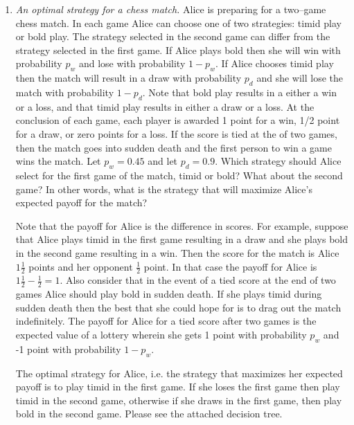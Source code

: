 \begin{enumerate}
\item \emph{An optimal strategy for a chess match.}  Alice is
  preparing for a two--game chess match.  In each game Alice can
  choose one of two strategies: timid play or bold play. The strategy
  selected in the second game can differ from the strategy selected
  in the first game. If Alice plays bold then she will win with
  probability $p_w$ and lose with probability $1-p_w$. If Alice
  chooses timid play then the match will result in a draw with probability
  $p_d$ and she will lose the match with probability $1-p_d$. Note
  that bold play results in a either a win or a loss, and that timid
  play results in either a draw or a loss. At the conclusion of each
  game, each player is awarded 1 point for a win, 1/2 point for a
  draw, or zero points for a loss. If the score is tied at the of two
  games, then the match goes into sudden death and the first person to
  win a game wins the match.  Let $p_w=0.45$ and let $p_d=0.9$. Which
  strategy should Alice select for the first game of the match, timid
  or bold? What about the second game? In other words, what is the
  strategy that will maximize Alice's expected payoff for the match?

  Note that the payoff for Alice is the difference in scores. For
  example, suppose that Alice plays timid in the first game resulting
  in a draw and she plays bold in the second game resulting in a win.
  Then the score for the match is Alice $1\frac{1}{2}$ points and her
  opponent $\frac{1}{2}$ point. In that case the payoff for Alice is
  $1\frac{1}{2} - \frac{1}{2} = 1$. Also consider that in the event of
  a tied score at the end of two games Alice should play bold in
  sudden death.  If she plays timid during sudden death then the best
  that she could hope for is to drag out the match indefinitely. The
  payoff for Alice for a tied score after two games is the expected
  value of a lottery wherein she gets 1 point with probability $p_w$
  and -1 point with probability $1-p_w$.

\begin{solution}
  \bs The optimal strategy for Alice, i.e. the strategy that maximizes
  her expected payoff is to play timid in the first game. If she loses
  the first game then play timid in the second game, otherwise if she
  draws in the first game, then play bold in the second game.  Please
  see the attached decision tree. 
\end{solution}


\end{enumerate}
